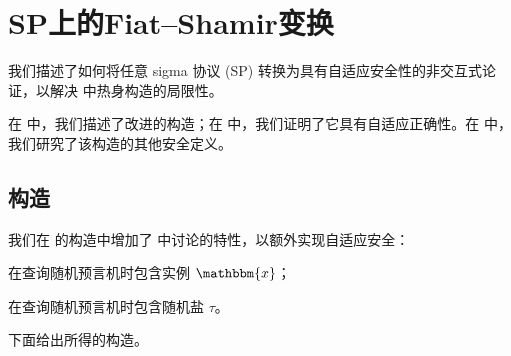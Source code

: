 \documentclass[american,singlepageview]{snargs-book-zh}
\newcommand{\Instance}{\mathbbm{x}}
\newcommand{\ProtoSalt}{\tau}
\newcommand{\RandSaltString}{\ProtoSalt}
\begin{document}
\chapter{SP上的Fiat--Shamir变换}
\label{chapter:fiat-shamir-transformation-for-sp}

我们描述了如何将任意 sigma 协议 (SP) 转换为具有自适应安全性的非交互式论证，以解决  中热身构造的局限性。

在  中，我们描述了改进的构造；在  中，我们证明了它具有自适应正确性。在  中，我们研究了该构造的其他安全定义。

\section{构造}
\label{section:narg-from-sp-construction}

我们在  的构造中增加了  中讨论的特性，以额外实现自适应安全：
\begin{inparaenum}[(i)]
  \item 在查询随机预言机时包含实例 $\Instance$；
  \item 在查询随机预言机时包含随机盐 $\RandSaltString$。
\end{inparaenum}
下面给出所得的构造。
\end{document}
